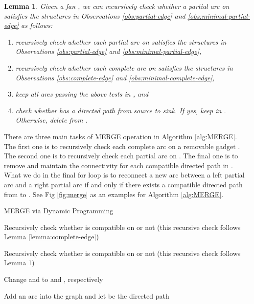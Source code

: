 \documentclass[11pt]{article}
\newtheorem{lemma}[figure]{Lemma}
\begin{document}
\begin{lemma}\label{lemma:partial-edge}
Given a fan ,
we can recursively check whether a partial arc  on 
satisfies the structures in Observations \ref{obs:partial-edge} and \ref{obs:minimal-partial-edge} as follows:
\begin{enumerate}
\item recursively check whether
each partial arc  on 
satisfies the structures in Observations \ref{obs:partial-edge} and \ref{obs:minimal-partial-edge},
\item recursively check whether
each complete arc  on  satisfies the structures
in Observations \ref{obs:complete-edge} and \ref{obs:minimal-complete-edge},
\item keep all arcs passing the above tests in , and
\item check whether  has a directed path from source to sink. If yes, keep  in .
Otherwise, delete  from .
\end{enumerate}
\end{lemma}

There are three main tasks of MERGE operation in Algorithm \ref{alg:MERGE}.
The first one is to recursively check each complete arc on a removable gadget .
The second one is to recursively check each partial arc on .
The final one is to remove  and maintain the connectivity
for each compatible directed path
in .
What we do in the final for loop is to
reconnect a new arc between a left partial arc  and a right partial arc 
if and only if there exists a compatible directed path from  to .
See Fig \ref{fig:merge} as an examples for Algorithm \ref{alg:MERGE}.

\begin{algorithm}[t]
\caption{MERGE  via Dynamic Programming}
\label{alg:MERGE}



{
Recursively check 
whether  is compatible on  or not
(this recursive check follows Lemma \ref{lemma:complete-edge})\;
}

{Recursively check 
whether  is compatible on  or not
(this recursive check follows Lemma \ref{lemma:partial-edge})\;
}

{

      Change  and  to
       and
      , respectively\;

      Add an arc  into the graph  and
      let  be the directed path
      \;
}

\end{algorithm}
\end{document}
